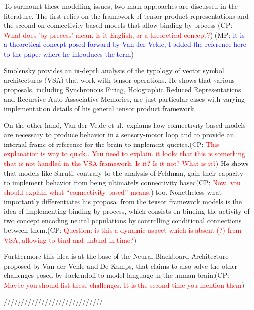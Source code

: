 \documentclass[10pt]{article}
\newcommand{\noteCP}[1]{(CP: \textcolor{red}{#1})}
\newcommand{\noteMP}[2]{(MP: \textcolor{blue}{#1})}
\begin{document}
To surmount these modelling issues, two main approaches are discussed in the literature. The first relies on the framework of tensor product
representations\cite{smolensky2006harmonic} and the second on connectivity based models that allow
binding by process\cite{van_der_Velde_2015}
\noteCP{What does 'by process' mean. Is it English, or a theoretical concept?}
\noteMP{It is a theoretical concept posed forward by Van der Velde, I added the reference here to the paper where he introduces the term}.


Smolensky provides an in-depth analysis of the typology of vector symbol architectures (VSA)
that work with tensor operations. He shows that various proposals,
including Synchronous Firing\cite{Shastri_1993}, Holographic Reduced
Representations\cite{Plate_1995} and Recursive Auto-Associative
Memories\cite{Chalmers_1992}, are just particular cases with varying
implementation details of his general tensor product framework.


On the
other hand, Van der Velde et al.\cite{van_der_Velde_2015}~explains how
connectivity based models are necessary to produce behavior in a
sensory-motor loop and to provide an internal frame of reference for the
brain to implement queries.\noteCP{This explanation is way to quick..
  You need to explain. it looks that this is something that is not
  handled in the VSA framework. Is it? Is it not? What is it?} He
shows that models like Shruti\cite{Shastri_1993}, contrary to the
analysis of Feldman\cite{Feldman_2012}, gain their capacity to
implement behavior from being ultimately connectivity
based\noteCP{Now, you should explain what ``connectivity based''
  means.} too. Nonetheless what importantly differentiates his
proposal from the tensor framework models is the idea of implementing
binding by process, which consists on binding the activity of two
concept encoding neural populations by controlling conditional
connections between them.\noteCP{Question: is this a dynamic aspect
  which is absent (?) from VSA, allowing to bind and unbind in time?}


Furthermore this idea is at the base of the Neural Blackboard
Architecture proposed by Van der Velde and De
Kamps\cite{van_der_Velde_2006}, that claims to also solve the other
challenges posed by Jackendoff to model language in the human
brain.\noteCP{Maybe you should list these challenges. It is the second
  time you mention them}

/////////////////////////////
\end{document}

